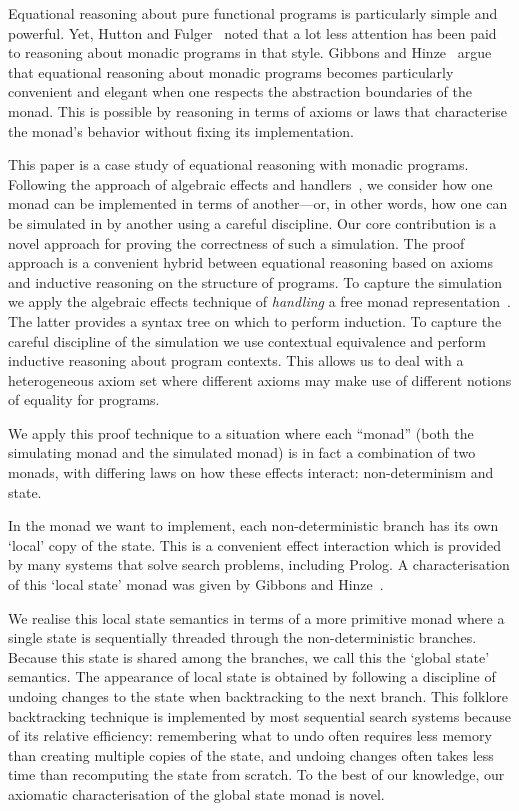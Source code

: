 \documentclass{llncs}
\begin{document}
Equational reasoning about pure functional programs is particularly simple and
powerful. Yet, Hutton and Fulger~\cite{HuttonFulger:08:Reasoning} noted that a
lot less attention has been paid to reasoning about monadic programs in that
style. Gibbons and Hinze~\cite{GibbonsHinze:11:Just} argue that equational
reasoning about monadic programs becomes particularly convenient and elegant
when one respects the abstraction boundaries of the monad. This is possible
by reasoning in terms of axioms or laws that characterise the monad's
behavior without fixing its implementation.

This paper is a case study of equational reasoning with monadic programs.
Following the approach of algebraic effects and
handlers~\cite{Plotkin:09:Handlers}, we consider how one monad can be
implemented in terms of another---or, in other words, how one can be simulated
in by another using a careful discipline. Our core contribution is a novel
approach for proving the correctness of such a simulation. The proof approach is
a convenient hybrid between equational reasoning based on axioms and inductive
reasoning on the structure of programs. To capture the simulation we apply the
algebraic effects technique of \emph{handling} a free monad
representation~\cite{Wu:14:Effect}.
The latter provides a syntax tree on which to perform
induction. To capture the careful discipline of the simulation we use contextual
equivalence and perform inductive reasoning about program contexts. This allows
us to deal with a heterogeneous axiom set where different axioms may make use of
different notions of equality for programs.

We apply this proof technique to a situation where
each ``monad'' (both the simulating monad and the simulated monad)
is in fact a combination of two monads, with differing laws on how these effects
interact:
non-determinism and state.

In the monad we want to implement, each
non-deterministic branch has its own `local' copy of the state. This is a
convenient effect interaction which is provided by many systems that solve
search problems, including Prolog.
A characterisation of this `local state' monad was given by Gibbons and
Hinze~\cite{GibbonsHinze:11:Just}.

We realise this local state semantics in terms of a more primitive monad where
a single state is sequentially threaded through the non-deterministic
branches. Because this state is shared among the branches, we call this the
`global state' semantics. The appearance of local state is obtained by
following a discipline of undoing changes to the state when backtracking to the
next branch. This folklore backtracking technique is implemented by most
sequential search systems because of its relative efficiency: remembering what
to undo often requires less memory than creating multiple copies of the state,
and undoing changes often takes less time than recomputing the state from
scratch.
To the best of our knowledge, our axiomatic characterisation of the global state
monad is novel.
\end{document}
